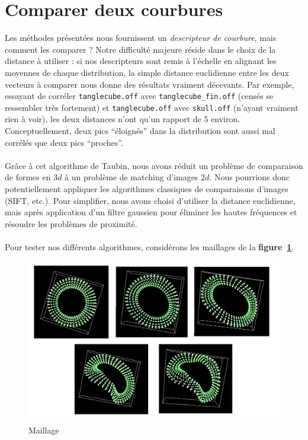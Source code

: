 \documentclass{llncs}
\begin{document}
\section{Comparer deux courbures}
Les méthodes présentées nous fournissent un \textit{descripteur de courbure}, mais comment les comparer ? Notre difficulté majeure réside dans le choix de la distance à utiliser : si nos descripteurs sont remis à l'échelle en alignant les moyennes de chaque distribution, la simple distance euclidienne entre les deux vecteurs à comparer nous donne des résultats vraiment décevants. Par exemple, essayant de corréler \texttt{tanglecube.off} avec \texttt{tanglecube\_fin.off} (censés se ressembler très fortement) et \texttt{tanglecube.off} avec \texttt{skull.off} (n'ayant vraiment rien à voir), les deux distances n'ont qu'un rapport de 5 environ. Conceptuellement, deux pics ``éloignés'' dans la distribution sont aussi mal corrélés que deux pics ``proches''.
\\\\
Grâce à cet algorithme de Taubin, nous avons réduit un problème de comparaison de formes en $3d$ à un problème de matching d’images $2d$. Nous pourrions donc potentiellement appliquer les algorithmes classiques de comparaisons d’images (SIFT, etc.). Pour simplifier, nous avons choisi d’utiliser la distance euclidienne, mais après application d’un filtre gaussien pour éliminer les hautes fréquences et résoudre les problèmes de proximité.
\\\\
Pour tester nos différents algorithmes, considérons les maillages de la \textbf{figure~\ref{maillages}}.
\begin{figure}
\center
\includegraphics[width=12cm]{img/tores.png}
\caption{Maillage}
\label{maillages}
\end{figure}
\end{document}
